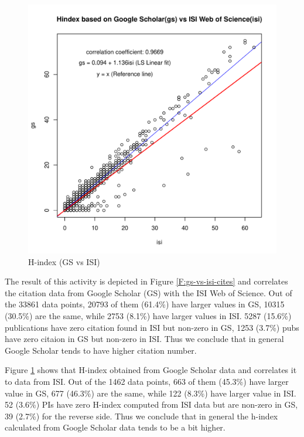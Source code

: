 \documentclass{sig-alternate}
\begin{document}
\begin{figure}[htb] 
  \centering 
    \includegraphics[width=1.0\columnwidth]{images/11_gs_vs_isi_hindex.pdf} 
  \caption{H-index (GS vs ISI)}\label{F:gs-vs-isi-hindex} 
\end{figure} 
 
The result of this activity is depicted in Figure \ref{F:gs-vs-isi-cites} and correlates the citation data from Google Scholar (GS) with the ISI Web of Science. Out of the 33861 data points, 20793 of them (61.4\%) have larger values in GS, 10315 (30.5\%) are the same, while 2753 (8.1\%) have larger values in ISI. 5287 (15.6\%) publications have zero citation found in ISI but non-zero in GS, 1253 (3.7\%) pubs have zero citaion in GS but non-zero in ISI. Thus we conclude that in general Google Scholar tends to have higher citation number. 
 
Figure \ref{F:gs-vs-isi-hindex} shows that H-index obtained from Google Scholar data and correlates it to data from ISI. Out of the 1462 data points, 663 of them (45.3\%) have larger value in GS, 677 (46.3\%) are the same, while 122 (8.3\%) have larger value in ISI. 52 (3.6\%) PIs have zero H-index computed from ISI data but are non-zero in GS, 39 (2.7\%) for the reverse side. Thus we conclude that in general the h-index calculated from Google Scholar data tends to be a bit higher. 
 
\end{document}
